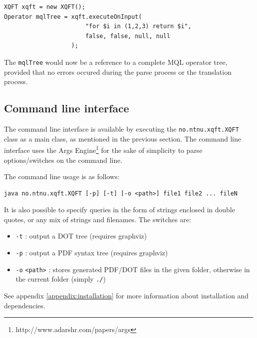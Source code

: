 \begin{Verbatim}
XQFT xqft = new XQFT();
Operator mqlTree = xqft.executeOnInput(
                       "for $i in (1,2,3) return $i", 
                       false, false, null, null
                   );
\end{Verbatim}

The \texttt{mqlTree} would now be a reference to a complete MQL operator tree,
provided that no errors occured during the parse process or the translation
process.

\subsection{Command line interface}
\label{sect:impl:system:cli}
The command line interface is available by executing the
\texttt{no.ntnu.xqft.XQFT} class as a main class, as mentioned in the previous
section. The command line interface uses the Args
Engine\footnote{http://www.adarshr.com/papers/args} for the sake of simplicity
to parse options/switches on the command line. 

The command line usage is as follows:

\begin{verbatim}
java no.ntnu.xqft.XQFT [-p] [-t] [-o <path>] file1 file2 ... fileN
\end{verbatim}

It is also possible to specify queries in the form of strings enclosed in
double quotes, or any mix of strings and filenames. The switches are:
\begin{itemize}
  \item \texttt{-t} : output a DOT tree (requires graphviz)
  \item \texttt{-p} : output a PDF syntax tree (requires graphviz)
  \item \texttt{-o} \texttt{<path>} : stores generated PDF/DOT files in the given folder, 
  otherwise in the current folder (simply \texttt{./})
\end{itemize}

See appendix \ref{appendix:installation} for more information about installation and
dependencies.
